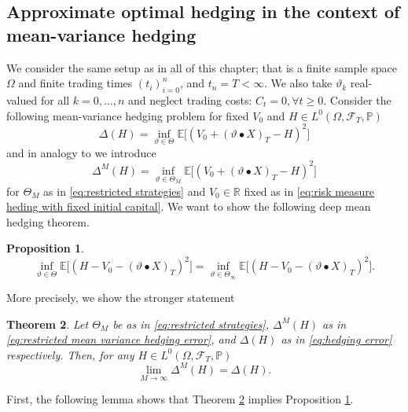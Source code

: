 \documentclass[11pt,a4paper,twoside,openany]{report}
\numberwithin{equation}{section}
\theoremstyle{plain} %
\newtheorem{theorem}{Theorem}[section]
\newtheorem{proposition}[theorem]{Proposition}
\theoremstyle{definition} %
\theoremstyle{remark} %
\let\parencite\authnumparencite
\begin{document}
\subsection{Approximate optimal hedging in the context of mean-variance hedging}
We consider the same setup as in all of this chapter; that is a finite sample space \(\Omega\) and finite trading times \((t_i)_{i=0}^n\), and \(t_n=T<\infty\). We also take \(\vartheta_k\) real-valued for all \(k=0,\dots,n\) and  neglect trading costs: \(C_t=0, \forall t\geq 0\). Consider the following mean-variance hedging problem for fixed \(V_0\) and \(H\in L^0(\Omega,\mathcal{F}_T,\mathbb{P})\)
\begin{equation}\label{eq:hedging error}
    \Delta(H) = \inf_{\vartheta\in\Theta}\mathbb{E}\Big[(V_0+(\vartheta\bullet X)_T-H)^2\Big]
\end{equation}
and in analogy to \parencite[Thm.~4.9.]{Buehler2018DeepHedging} we introduce
\begin{equation}\label{eq:restricted mean variance hedging error}
    \Delta^M(H) = \inf_{\vartheta\in\Theta_M}\mathbb{E}\Big[(V_0+(\vartheta\bullet X)_T-H)^2\Big]
\end{equation}
for \(\Theta_M\) as in \eqref{eq:restricted strategies} and \(V_0\in\mathbb{R}\) fixed as in  \eqref{eq:risk measure heding with fixed initial capital}. We want to show the following deep mean hedging theorem.
\begin{proposition}\label{prop:finite deep mean variance hedging}
    \begin{equation*}
        \inf_{\vartheta\in\Theta}\mathbb{E}\Big[(H-V_0-(\vartheta\bullet X)_T)^2\Big]=\inf_{\vartheta\in\Theta_{\infty}}\mathbb{E}\Big[(H-V_0-(\vartheta\bullet X)_T)^2\Big].
    \end{equation*}
\end{proposition}
More precisely, we show the stronger statement
\begin{theorem}\label{thm:strong discrete deep mean variance hedging}
Let \(\Theta_M\) be as in \eqref{eq:restricted strategies}, \(\Delta^M(H)\) as in \eqref{eq:restricted mean variance hedging error}, and \(\Delta(H)\) as in \eqref{eq:hedging error} respectively. Then, for any \(H\in L^0(\Omega,\mathcal{F}_T,\mathbb{P})\)
    \begin{equation*}
        \lim_{M\to\infty}\Delta^M(H)=\Delta(H).
    \end{equation*}
\end{theorem}
First, the following lemma shows that Theorem \ref{thm:strong discrete deep mean variance hedging} implies Proposition \ref{prop:finite deep mean variance hedging}.
\end{document}
